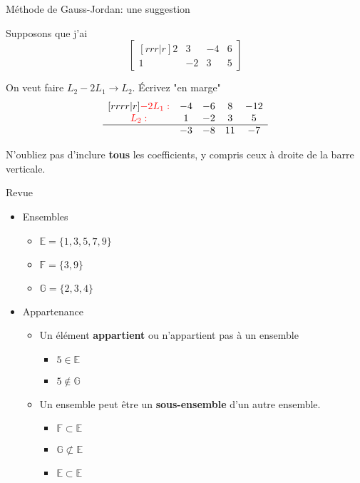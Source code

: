 \documentclass[french, handout]{beamer}
\begin{document}
\begin{frame}{Méthode de Gauss-Jordan: une suggestion}

Supposons que j'ai
\[
\begin{bmatrix}[rrr|r]
2 & 3 & -4 & 6\\
1 & -2 & 3 & 5
\end{bmatrix}
\]

On veut faire $L_2 -2L_1 \rightarrow L_2$. Écrivez "en marge"
\[
\begin{matrix}[rrrr|r]
{\color{red}-2L_1:} & -4 & -6 & 8 & -12\\
{\color{red}L_2:} & 1 & -2 & 3 & 5 \\
\hline
& -3 & -8 & 11 & -7
\end{matrix}
\]

\vfill
N'oubliez pas d'inclure \textbf{tous} les coefficients, y compris ceux
à droite de la barre verticale.

\end{frame}		
	
	
\begin{frame}{Revue}

\begin{itemize}
\item Ensembles
	\begin{itemize}
	\item $\mathbb{E} = \{ 1, 3, 5, 7, 9\}$
	\item $\mathbb{F} = \{3, 9\}$
	\item $\mathbb{G} = \{2, 3, 4\}$
	\end{itemize}
\item Appartenance
	\begin{itemize}
	\item Un élément \textbf{appartient} ou n'appartient pas à un ensemble
		\begin{itemize}
		\item $5 \in \mathbb{E}$
		\item $5 \notin \mathbb{G}$
		\end{itemize}
	\item Un ensemble peut être un \textbf{sous-ensemble} d'un autre ensemble.
		\begin{itemize}
		\item $\mathbb{F} \subset \mathbb{E}$
		\item $\mathbb{G} \not \subset \mathbb{E}$
		\item $\mathbb{E} \subset \mathbb{E}$		
		\end{itemize}
	\end{itemize}
\end{itemize}

\end{frame}
\end{document}
